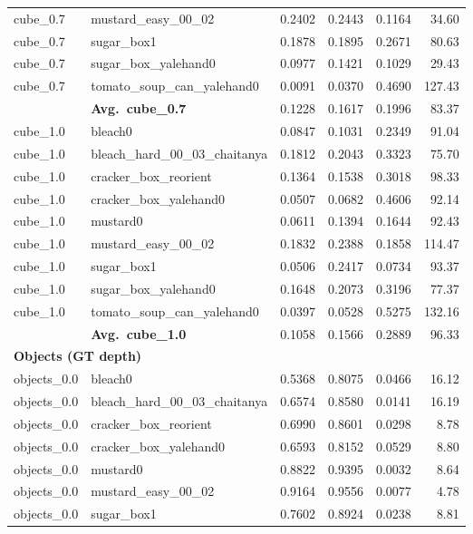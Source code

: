 \begin{longtable}{llrrrr}
  cube_0.7 & mustard\_easy\_00\_02 & 0.2402 & 0.2443 & 0.1164 & 34.60 \\
  cube_0.7 & sugar\_box1 & 0.1878 & 0.1895 & 0.2671 & 80.63 \\
  cube_0.7 & sugar\_box\_yalehand0 & 0.0977 & 0.1421 & 0.1029 & 29.43 \\
  cube_0.7 & tomato\_soup\_can\_yalehand0 & 0.0091 & 0.0370 & 0.4690 & 127.43 \\
  \cmidrule{2-6}
  & \textbf{Avg.~cube_0.7} & 0.1228 & 0.1617 & 0.1996 & 83.37 \\
  \midrule
  cube_1.0 & bleach0 & 0.0847 & 0.1031 & 0.2349 & 91.04 \\
  cube_1.0 & bleach\_hard\_00\_03\_chaitanya & 0.1812 & 0.2043 & 0.3323 & 75.70 \\
  cube_1.0 & cracker\_box\_reorient & 0.1364 & 0.1538 & 0.3018 & 98.33 \\
  cube_1.0 & cracker\_box\_yalehand0 & 0.0507 & 0.0682 & 0.4606 & 92.14 \\
  cube_1.0 & mustard0 & 0.0611 & 0.1394 & 0.1644 & 92.43 \\
  cube_1.0 & mustard\_easy\_00\_02 & 0.1832 & 0.2388 & 0.1858 & 114.47 \\
  cube_1.0 & sugar\_box1 & 0.0506 & 0.2417 & 0.0734 & 93.37 \\
  cube_1.0 & sugar\_box\_yalehand0 & 0.1648 & 0.2073 & 0.3196 & 77.37 \\
  cube_1.0 & tomato\_soup\_can\_yalehand0 & 0.0397 & 0.0528 & 0.5275 & 132.16 \\
  \cmidrule{2-6}
  & \textbf{Avg.~cube_1.0} & 0.1058 & 0.1566 & 0.2889 & 96.33 \\
  \midrule
\multicolumn{6}{l}{\textbf{Objects (GT depth)}} \\
\midrule
  objects_0.0 & bleach0 & 0.5368 & 0.8075 & 0.0466 & 16.12 \\
  objects_0.0 & bleach\_hard\_00\_03\_chaitanya & 0.6574 & 0.8580 & 0.0141 & 16.19 \\
  objects_0.0 & cracker\_box\_reorient & 0.6990 & 0.8601 & 0.0298 & 8.78 \\
  objects_0.0 & cracker\_box\_yalehand0 & 0.6593 & 0.8152 & 0.0529 & 8.80 \\
  objects_0.0 & mustard0 & 0.8822 & 0.9395 & 0.0032 & 8.64 \\
  objects_0.0 & mustard\_easy\_00\_02 & 0.9164 & 0.9556 & 0.0077 & 4.78 \\
  objects_0.0 & sugar\_box1 & 0.7602 & 0.8924 & 0.0238 & 8.81 \\

\end{longtable}
